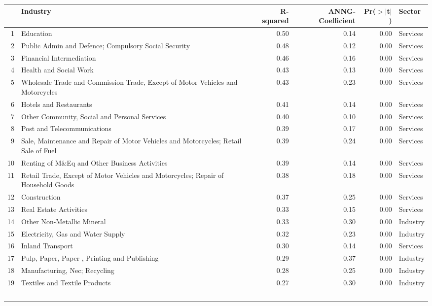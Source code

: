 \begin{table}[ht]
\centering
\begin{tabular}{rlrrrl}
  \hline
 & Industry & R-squared & ANNG-Coefficient & Pr($>$$|$t$|$) & Sector \\ 
  \hline
1 & Education & 0.50 & 0.14 & 0.00 & Services \\ 
  2 & Public Admin and Defence; Compulsory Social Security & 0.48 & 0.12 & 0.00 & Services \\ 
  3 & Financial Intermediation & 0.46 & 0.16 & 0.00 & Services \\ 
  4 & Health and Social Work & 0.43 & 0.13 & 0.00 & Services \\ 
  5 & Wholesale Trade and Commission Trade, Except of Motor Vehicles and Motorcycles & 0.43 & 0.23 & 0.00 & Services \\ 
  6 & Hotels and Restaurants & 0.41 & 0.14 & 0.00 & Services \\ 
  7 & Other Community, Social and Personal Services & 0.40 & 0.10 & 0.00 & Services \\ 
  8 & Post and Telecommunications & 0.39 & 0.17 & 0.00 & Services \\ 
  9 & Sale, Maintenance and Repair of Motor Vehicles and Motorcycles; Retail Sale of Fuel & 0.39 & 0.24 & 0.00 & Services \\ 
  10 & Renting of M\&Eq and Other Business Activities & 0.39 & 0.14 & 0.00 & Services \\ 
  11 & Retail Trade, Except of Motor Vehicles and Motorcycles; Repair of Household Goods & 0.38 & 0.18 & 0.00 & Services \\ 
  12 & Construction & 0.37 & 0.25 & 0.00 & Services \\ 
  13 & Real Estate Activities & 0.33 & 0.15 & 0.00 & Services \\ 
  14 & Other Non-Metallic Mineral & 0.33 & 0.30 & 0.00 & Industry \\ 
  15 & Electricity, Gas and Water Supply & 0.32 & 0.23 & 0.00 & Industry \\ 
  16 & Inland Transport & 0.30 & 0.14 & 0.00 & Services \\ 
  17 & Pulp, Paper, Paper , Printing and Publishing & 0.29 & 0.37 & 0.00 & Industry \\ 
  18 & Manufacturing, Nec; Recycling & 0.28 & 0.25 & 0.00 & Industry \\ 
  19 & Textiles and Textile Products & 0.27 & 0.30 & 0.00 & Industry \\ 
$$
\end{tabular}
\end{table}
